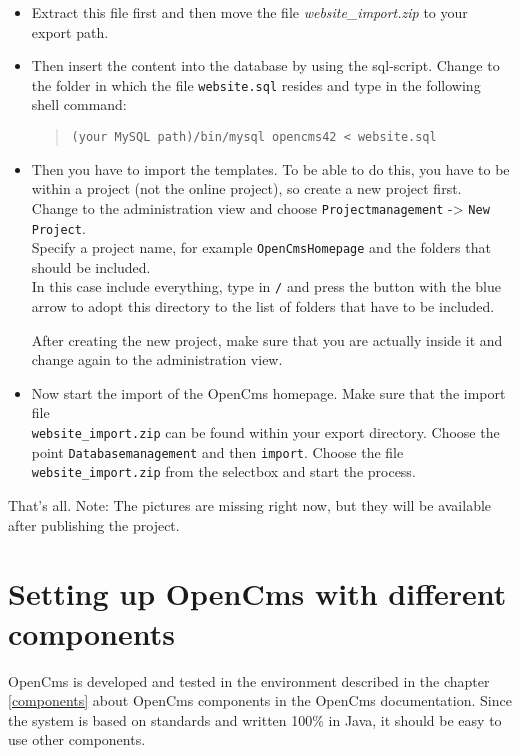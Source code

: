 \begin{itemize}
\item
Extract this file first and then move the file \textit{website\_import.zip} to your
export path.

\item
Then insert the content into the database by using the sql-script.
Change to the folder in which the file
\texttt{website.sql} resides and type in the following shell command:

\begin{quote}
\texttt{(your MySQL path)/bin/mysql opencms42 < website.sql}
\end{quote}

\item
Then you have to import the templates.
To be able to do this, you have to be within a project
(not the online project), so create a new
project first. \\
Change to the administration view and choose \texttt{Projectmanagement}
-> \texttt{New Project}.\\ 
Specify a project name, for example \texttt{OpenCmsHomepage} and the folders that
should be included. \\
In this case include everything, type in \texttt{/} and press
the button with the blue arrow to adopt this directory to the list of folders that
have to be included.

After creating the new project, make sure that you are actually inside it and
change again to the administration view. 

\item
Now start the import of the OpenCms homepage. 
Make sure that the import file \\
\texttt{website\_import.zip} can be found within your
export directory.
Choose the point \texttt{Databasemanagement} and then \texttt{import}.
Choose the file \texttt{website\_import.zip} from the selectbox and start the process.

\end{itemize}
That's all.
Note: The pictures are missing right now, but they will be available after
publishing the project.

\section{Setting up OpenCms with different components}
OpenCms is developed and tested in the environment described in the
chapter \ref{components} about OpenCms components in the 
OpenCms documentation. Since the system is based on standards and
written 100\% in Java, it should be easy to use other components.

